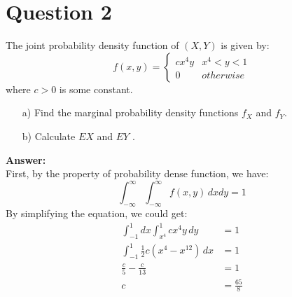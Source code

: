 \documentclass[hidelinks]{article}
\begin{document}
\section{Question 2}
The joint probability density function of $(X, Y)$ is given by:
\[
f(x,y) = 
\begin{cases}
    cx^4y & x^4 < y < 1 \\
    0 & otherwise
\end{cases}
\]
where $c > 0$ is some constant.
\begin{enumerate}
    \item[a)]  Find the marginal probability density functions $f_X$ and $f_Y$.
    \item[b)]  Calculate $EX$ and $EY$ .
\end{enumerate}

\textbf{Answer:}\\
    First, by the property of probability dense function, we have:
    \begin{equation*}
        \int^\infty_{-\infty}\int^\infty_{-\infty} f(x,y) \, dxdy = 1
    \end{equation*}
    By simplifying the equation, we could get:
    \begin{align*}
        \int^{1}_{-1}dx\int^{1}_{x^4} cx^4y \, dy &= 1 \\
        \int^{1}_{-1} \frac{1}{2}c(x^4 - x^{12}) \, dx &= 1  \\
        \frac{c}{5} - \frac{c}{13} &= 1 \\
        c &= \frac{65}{8}
    \end{align*}
\end{document}
